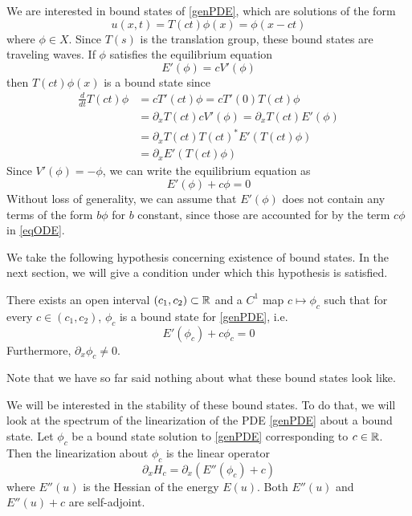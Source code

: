 \documentclass[thesis.tex]{subfiles}
\begin{document}
We are interested in bound states of \eqref{genPDE}, which are solutions of the form
\begin{equation}
u(x, t) = T(ct)\phi(x) = \phi(x - ct)
\end{equation}
where $\phi \in X$. Since $T(s)$ is the translation group, these bound states are traveling waves. If $\phi$ satisfies the equilibrium equation
\begin{equation}\label{eqODE1}
E'(\phi) = c V'(\phi)
\end{equation}
then $T(ct)\phi(x)$ is a bound state since 
\begin{align*}
\frac{d}{dt}T(ct)\phi &= c T'(ct)\phi 
= c T'(0)T(ct)\phi \\
&= \partial_x T(ct) c V'(\phi)
= \partial_x T(ct) E'(\phi) \\
&= \partial_x T(ct) T(ct)^* E'(T(ct)\phi) \\
&= \partial_x E'(T(ct)\phi) 
\end{align*}
Since $V'(\phi) = -\phi$, we can write the equilibrium equation as
\begin{equation}\label{eqODE}
E'(\phi) + c \phi = 0 
\end{equation}
Without loss of generality, we can assume that $E'(\phi)$ does not contain any terms of the form $b\phi$ for $b$ constant, since those are accounted for by the term $c \phi$ in \eqref{eqODE}.

We take the following hypothesis concerning existence of bound states. In the next section, we will give a condition under which this hypothesis is satisfied. 
\begin{hypothesis}\label{cintervalhyp}
There exists an open interval $(c_1, c_2) \subset {\mathbb R}$ and a $C^1$ map $c \mapsto \phi_c$ such that for every $c \in (c_1, c_2)$, $\phi_c$ is a bound state for \eqref{genPDE}, i.e. 
\[
E'(\phi_c) + c \phi_c = 0 
\]
Furthermore, $\partial_x \phi_c \neq 0$.
\end{hypothesis}
Note that we have so far said nothing about what these bound states look like.

We will be interested in the stability of these bound states. To do that, we will look at the spectrum of the linearization of the PDE \eqref{genPDE} about a bound state. Let $\phi_c$ be a bound state solution to \eqref{genPDE} corresponding to $c \in {\mathbb R}$. Then the linearization about $\phi_c$ is the linear operator
\begin{equation}\label{PDElinearization}
\partial_x H_c = 
\partial_x (E''(\phi_c) + c )
\end{equation}
where $E''(u)$ is the Hessian of the energy $E(u)$. Both $E''(u)$ and $E''(u) + c$ are self-adjoint. 
\end{document}

